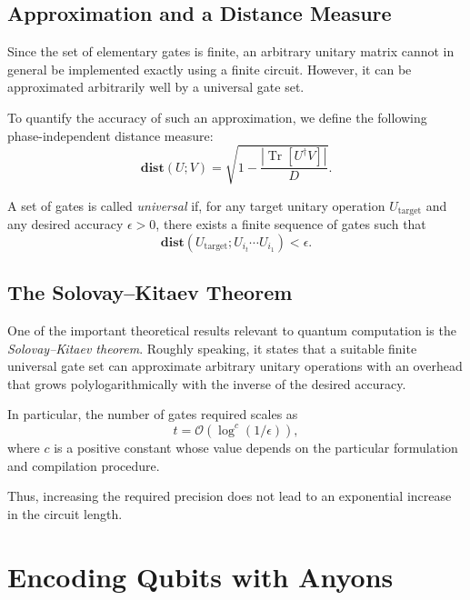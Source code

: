 \documentclass[11pt]{article}
\begin{document}
	\subsection{Approximation and a Distance Measure}
	
	Since the set of elementary gates is finite, an arbitrary unitary matrix cannot in general be implemented exactly using a finite circuit. However, it can be approximated arbitrarily well by a universal gate set.
	
	To quantify the accuracy of such an approximation, we define the following phase-independent distance measure:
	\begin{equation}
		\mathbf{dist}(U;V)
		=
		\sqrt{
			1-\frac{|\operatorname{Tr}[U^\dagger V]|}{D}
		}.
	\end{equation}
	
	A set of gates is called \emph{universal} if, for any target unitary operation $U_{\mathrm{target}}$ and any desired accuracy $\epsilon>0$, there exists a finite sequence of gates such that
	\begin{equation}
		\mathbf{dist}
		\left(
		U_{\mathrm{target}};
		U_{i_t}\cdots U_{i_1}
		\right)
		<
		\epsilon.
	\end{equation}
	
	\subsection{The Solovay--Kitaev Theorem}
	
	One of the important theoretical results relevant to quantum computation is the \emph{Solovay--Kitaev theorem}. Roughly speaking, it states that a suitable finite universal gate set can approximate arbitrary unitary operations with an overhead that grows polylogarithmically with the inverse of the desired accuracy.
	
	In particular, the number of gates required scales as
	\begin{equation}
		t = \mathcal{O}\!\left(\log^{c}(1/\epsilon)\right),
	\end{equation}
	where $c$ is a positive constant whose value depends on the particular formulation and compilation procedure.
	
	Thus, increasing the required precision does not lead to an exponential increase in the circuit length.
	
	
	\section{Encoding Qubits with Anyons}
	
\end{document}
